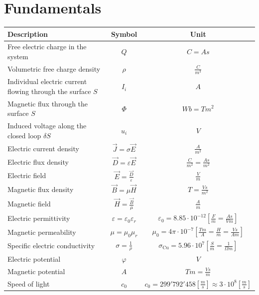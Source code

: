 \section{Fundamentals}

\begin{tabular}{|l|c|c|}
\hline \textbf{Description} & \textbf{Symbol} & \textbf{Unit} \\ 
\hline Free electric charge in the system & $Q$ & $C = As$ \\
\hline Volumetric free charge density & $\rho$ & $\frac{C}{m^3}$ \\
\hline Individual electric current flowing through the surface $S$ & $I_i$ & $A$ \\
\hline Magnetic flux through the surface $S$ & $\Phi$	& $Wb = Tm^2$\\
\hline Induced voltage along the closed loop $\delta S$ & $u_i$ & $V$ \\
\hline Electric current density & $\vec{J} = \sigma \vec{E}$ & $\frac{A}{m^2}$\\
\hline Electric flux density & $\vec{D} = \varepsilon \vec{E}$ & $\frac{C}{m^2} = \frac{As}{m^2}$\\
\hline Electric field & $\vec{E} = \frac{\vec{D}}{\varepsilon}$ & $\frac{V}{m}$\\
\hline Magnetic flux density & $\vec{B} = \mu \vec{H}$ & $T = \frac{Vs}{m^2}$\\
\hline Magnetic field & $\vec{H} = \frac{\vec{B}}{\mu}$ & $\frac{A}{m}$\\
\hline Electric permittivity & $\varepsilon = \varepsilon_0 \varepsilon_r$ & $\varepsilon_0 = 8.85 \cdot 10^{-12} \left[\frac{F}{m} = \frac{As}{Vm}\right]$\\
\hline Magnetic permeability & $\mu = \mu_0 \mu_r$ & $\mu_0 = 4\pi \cdot 10^{-7} \left[\frac{Tm}{A} = \frac{H}{m} = \frac{Vs}{Am}\right]$ \\
\hline Specific electric conductivity & $\sigma = \frac{1}{\rho}$ & $\sigma_\textrm{Cu} = 5.96 \cdot 10^7 \left[\frac{S}{m} = \frac{1}{\Omega m}\right]$ \\
\hline Electric potential & $\varphi$ & $V$ \\
\hline Magnetic potential & $A$ & $Tm = \frac{Vs}{m}$ \\
\hline Speed of light & $c_0$ & $c_0 = 299'792'458 [\frac{m}{s}] \approx 3\cdot 10^8 [\frac{m}{s}]$\\
\hline
\end{tabular} 

